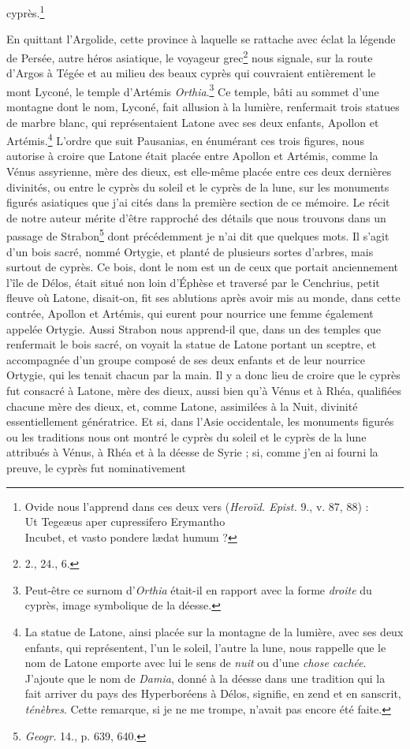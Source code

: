 \documentclass{article}
\begin{document}
cyprès.\footnote{Ovide nous l'apprend dans ces deux vers (\emph{Heroïd. Epist.} 9., v. 87, 88) :\\\hspace*{10mm}Ut Tegeæus aper cupressifero Erymantho\\\hspace*{10mm}Incubet, et vasto pondere lædat humum ?}

En quittant l'Argolide, cette province à laquelle se rattache avec éclat la légende de Persée, autre héros asiatique, le voyageur grec\footnote{2., 24., 6.} nous signale, sur la route d'Argos à Tégée et au milieu des beaux cyprès qui couvraient entièrement le mont Lyconé, le temple d'Artémis \emph{Orthia}.\footnote{Peut-être ce surnom d'\emph{Orthia} était-il en rapport avec la forme \emph{droite} du cyprès, image symbolique de la déesse.} Ce temple, bâti au sommet d'une montagne dont le nom, Lyconé, fait allusion à la lumière, renfermait trois statues de marbre blanc, qui représentaient Latone avec ses deux enfants, Apollon et Artémis.\footnote{La statue de Latone, ainsi placée sur la montagne de la lumière, avec ses deux enfants, qui représentent, l'un le soleil, l'autre la lune, nous rappelle que le nom de Latone emporte avec lui le sens de \emph{nuit} ou d'une \emph{chose cachée}. J'ajoute que le nom de \emph{Damia}, donné à la déesse dans une tradition qui la fait arriver du pays des Hyperboréens à Délos, signifie, en zend et en sanscrit, \emph{ténèbres}. Cette remarque, si je ne me trompe, n'avait pas encore été faite.} L'ordre que suit Pausanias, en énumérant ces trois figures, nous autorise à croire que Latone était placée entre Apollon et Artémis, comme la Vénus assyrienne, mère des dieux, est elle-même placée entre ces deux dernières divinités, ou entre le cyprès du soleil et le cyprès de la lune, sur les monuments figurés asiatiques que j'ai cités dans la première section de ce mémoire. Le récit de notre auteur mérite d'être rapproché des détails que nous trouvons dans un passage de Strabon\footnote{\emph{Geogr.} 14., p. 639, 640.} dont précédemment je n'ai dit que quelques mots. Il s'agit d'un bois sacré, nommé Ortygie, et planté de plusieurs sortes d'arbres, mais surtout de cyprès. Ce bois, dont le nom est un de ceux que portait anciennement l'île de Délos, était situé non loin d'Éphèse et traversé par le Cenchrius, petit fleuve où Latone, disait-on, fit ses ablutions après avoir mis au monde, dans cette contrée, Apollon et Artémis, qui eurent pour nourrice une femme également appelée Ortygie. Aussi Strabon nous apprend-il que, dans un des temples que renfermait le bois sacré, on voyait la statue de Latone portant un sceptre, et accompagnée d'un groupe composé de ses deux enfants et de leur nourrice Ortygie, qui les tenait chacun par la main. Il y a donc lieu de croire que le cyprès fut consacré à Latone, mère des dieux, aussi bien qu'à Vénus et à Rhéa, qualifiées chacune mère des dieux, et, comme Latone, assimilées à la Nuit, divinité essentiellement génératrice. Et si, dans l'Asie occidentale, les monuments figurés ou les traditions nous ont montré le cyprès du soleil et le cyprès de la lune attribués à Vénus, à Rhéa et à la déesse de Syrie ; si, comme j'en ai fourni la preuve, le cyprès fut nominativement 
\end{document}
